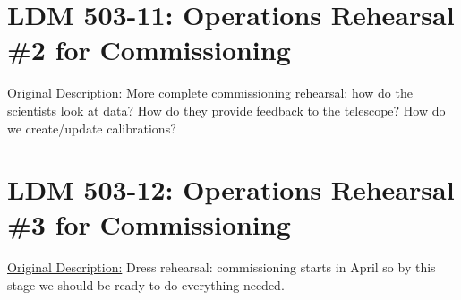 \section{LDM 503-11: Operations Rehearsal \#2 for Commissioning}

\underline{Original Description:}
More complete commissioning rehearsal: how do the scientists look at data? 
How do they provide feedback to the telescope? How do we create/update 
calibrations?

%
%
%

\section{LDM 503-12: Operations Rehearsal \#3 for Commissioning}

\underline{Original Description:}
Dress rehearsal: commissioning starts in April so by this stage we should 
be ready to do everything needed.


